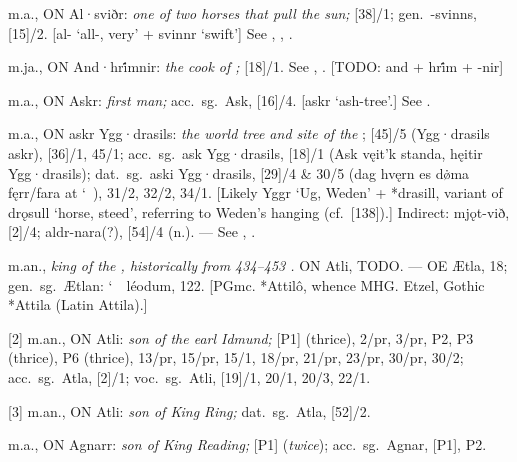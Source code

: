 \begin{itemize}

 m.a., ON Al·sviðr:
  \emph{one of two horses that pull the sun;} [38]/1; gen.~-svinns, [15]/2.
  [al- ‘all-, very’ + svinnr ‘swift’]
  See , , .

 m.ja., ON And·hri̇́mnir:
  \emph{the cook of ;} [18]/1.  See , .
  [TODO: and + hri̇́m + -nir]

 m.a., ON Askr:
  \emph{first man;} acc.~sg.~Ask, [16]/4.
  [askr ‘ash-tree’.]
  See .

 m.a., ON askr Ygg·drasils:
  \emph{the world tree and site of the }; [45]/5 (Ygg·drasils askr), [36]/1, 45/1; acc.~sg.~ask Ygg·drasils, [18]/1 (Ask vęit’k standa, hęitir Ygg·drasils); dat.~sg.~aski Ygg·drasils, [29]/4 \& 30/5 (dag hvęrn es dø̇ma fęrr/fara at \char`~), 31/2, 32/2, 34/1.
  [Likely Yggr ‘Ug, Weden’ + *drasill, variant of drǫsull ‘horse, steed’, referring to Weden’s hanging (cf.~[138]).]
  Indirect: mjǫt-við, [2]/4; aldr-nara(?), [54]/4 (n.).
  --- See , .

 m.an.,
  \emph{king of the , historically from 434--453 \ce.}
  ON Atli, TODO.
  --- OE Ætla,  18; gen.~sg.~Ætlan: \char`~\ léodum,  122.
  [PGmc. *Attilô, whence MHG. Etzel, Gothic *Attila (Latin Attila).]

[2] m.an., ON Atli:
  \emph{son of the earl Idmund;} [P1] (thrice), 2/pr, 3/pr, P2, P3 (thrice), P6 (thrice), 13/pr, 15/pr, 15/1, 18/pr, 21/pr, 23/pr, 30/pr, 30/2; acc.~sg.~Atla, [2]/1; voc.~sg.~Atli, [19]/1, 20/1, 20/3, 22/1.

[3] m.an., ON Atli:
  \emph{son of King Ring;} dat.~sg.~Atla, [52]/2.

 m.a., ON Agnarr:
  \emph{son of King Reading;} [P1] (\emph{twice}); acc.~sg.~Agnar, [P1], P2.


\end{itemize}
